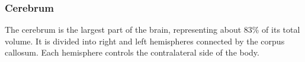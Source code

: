 \subsubsection*{Cerebrum}
The cerebrum is the largest part of the brain, representing about 83\% of its total volume. It is divided into right and left hemispheres connected by the corpus callosum. Each hemisphere controls the contralateral side of the body.








